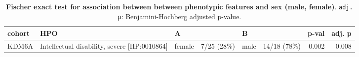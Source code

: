 \begin{table}
\centering
\begin{tabular}{l>{\raggedright}p{4cm}lp{2cm}lp{2.4cm}rr}
\toprule
\textbf{cohort} & \textbf{HPO} & \textbf{A} & \textbf{} & \textbf{B} & \textbf{} & \textbf{p-val} & \textbf{adj. p}\\
\midrule
KDM6A & Intellectual disability, severe [HP:0010864] & female & 7/25 (28\%) & male & 14/18 (78\%) & 0.002 & 0.008\\
\bottomrule
\end{tabular}
\caption{\textbf{Fischer exact test for association between  between phenotypic features and sex (male, female)}. \texttt{adj. p}: Benjamini-Hochberg adjusted p-value.}
\label{tab:mf_hpo}
\end{table}
\clearpage
\newpage

